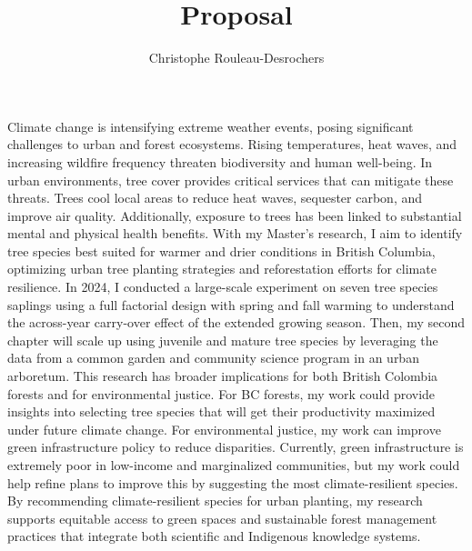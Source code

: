 \documentclass[11pt,letter]{article}
\title{Proposal}
\author{Christophe Rouleau-Desrochers}
\begin{document}

\maketitle

Climate change is intensifying extreme weather events, posing significant challenges to urban and forest ecosystems. Rising temperatures, heat waves, and increasing wildfire frequency threaten biodiversity and human well-being. In urban environments, tree cover provides critical services that can mitigate these threats. Trees cool local areas to reduce heat waves, sequester carbon, and improve air quality. Additionally, exposure to trees has been linked to substantial mental and physical health benefits. With my Master's research, I aim to identify tree species best suited for warmer and drier conditions in British Columbia, optimizing urban tree planting strategies and reforestation efforts for climate resilience.
In 2024, I conducted a large-scale experiment on seven tree species saplings using a full factorial design with spring and fall warming to understand the across-year carry-over effect of the extended growing season. Then, my second chapter will scale up using juvenile and mature tree species by leveraging the data from a common garden and community science program in an urban arboretum. This research has broader implications for both British Colombia forests and for environmental justice. For BC forests, my work could provide insights into selecting tree species that will get their productivity maximized under future climate change. For environmental justice, my work can improve green infrastructure policy to reduce disparities. Currently, green infrastructure is extremely poor in low-income and marginalized communities, but my work could help refine plans to improve this by suggesting the most climate-resilient species. By recommending climate-resilient species for urban planting, my research supports equitable access to green spaces and sustainable forest management practices that integrate both scientific and Indigenous knowledge systems.
\end{document}

